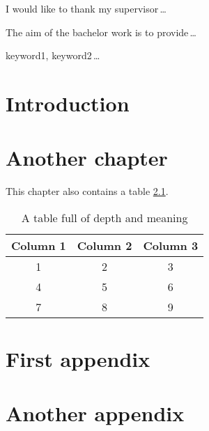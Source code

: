 \documentclass[12pt,oneside]{fithesis3}
\begin{document}
  \FrontMatter                    %
    \ThesisTitlePage                %
    \begin{ThesisDeclaration}       %
      \DeclarationText
      \AdvisorName
    \end{ThesisDeclaration}
    \begin{ThesisThanks}            %
      I would like to thank my supervisor\,\dots
    \end{ThesisThanks}
    \begin{ThesisAbstract}          %
      The aim of the bachelor work is to provide\,\dots
    \end{ThesisAbstract}
    \begin{ThesisKeyWords}          %
      keyword1, keyword2\,\dots
    \end{ThesisKeyWords}
    \tableofcontents                %
  
  \MainMatter                     %
    \chapter{Introduction}          %
    \Blindtext
    \chapter{Another chapter}
    \blindtext
    This chapter also contains a table \ref{table:example}.
    
    \begin{table}
      \centering
      \begin{tabular}{ccc}
        \textbf{Column 1} & \textbf{Column 2} & \textbf{Column 3} \\
        \hline
        1 & 2 & 3 \\
        4 & 5 & 6 \\
        7 & 8 & 9
      \end{tabular}
      \caption{A table full of depth and meaning}
      \label{table:example}
    \end{table}
    \listoftables                   %
    \listoffigures                  %

  \begin{appendices}              %
    \chapter{First appendix}
    \Blindtext
    \chapter{Another appendix}
    \Blindtext
  \end{appendices}
\end{document}
